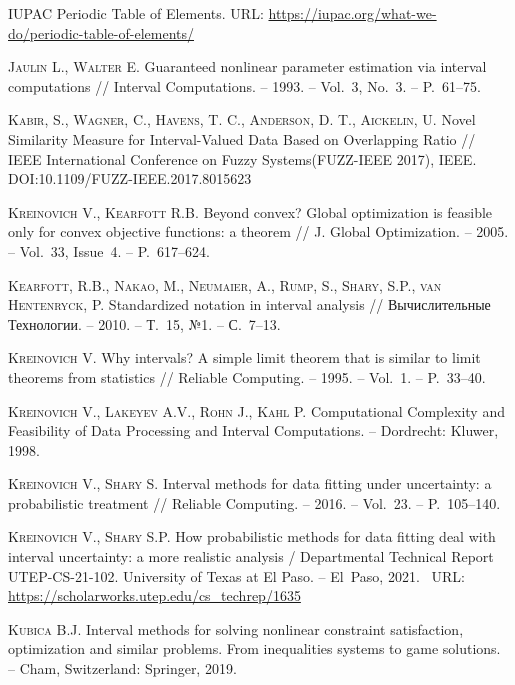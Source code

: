 \documentclass[a5paper,openany]{book}
\newcommand{\electronicbook}{}%
\newcommand{\doi}[1]{
    \ifdefined\electronicbook
        DOI:#1
    \fi}%
\begin{document}
\begin{thebibliography}{999}
IUPAC Periodic Table of Elements. URL: 
\url{https://iupac.org/what-we-do/periodic-table-of-elements/} 
  
\textsc{Jaulin L., Walter E.} Guaranteed nonlinear parameter estimation via interval 
computations // Interval Computations. -- 1993. -- Vol.~3, No.~3. -- P.~61--75. 

\textsc{Kabir, S., Wagner, C., Havens, T. C., Anderson, D. T., Aickelin, U.}
Novel Similarity Measure for Interval-Valued Data Based on Overlapping Ratio // IEEE International Conference on Fuzzy Systems(FUZZ-IEEE 2017), IEEE. \doi{10.1109/FUZZ-IEEE.2017.8015623}
   
\textsc{Kreinovich V., Kearfott R.B.} Beyond convex? Global optimization is feasible 
only for convex objective functions: a theorem // J. Global Optimization. -- 2005. 
-- Vol.~33, Issue~4. -- P.~617--624. 
  
\textsc{Kearfott, R.B., Nakao, M., Neumaier, A., Rump, S., Shary, S.P., van Hentenryck, 
P.} Standardized notation in interval analysis // Вычислительные Технологии. -- 
2010. -- Т.~15, №1. -- С.~7--13. 
  
\textsc{Kreinovich V.} Why intervals? A simple limit theorem that is similar 
to limit theorems from statistics // Reliable Computing. -- 1995. -- Vol.~1. 
-- P.~33--40.  
  
\textsc{Kreinovich V., Lakeyev A.V., Rohn J., Kahl P.} Computational Complexity 
and Feasibility of Data Processing and Interval Computations. -- Dordrecht: Kluwer, 
1998.  
  
\textsc{Kreinovich V., Shary S.} Interval methods for data fitting under uncertainty: 
a probabilistic treatment // Reliable Computing. -- 2016. -- Vol.~23. -- P.~105--140. 
  
\textsc{Kreinovich V., Shary S.P.} How probabilistic methods for data fitting deal 
with interval uncertainty: a more realistic analysis / Departmental Technical Report 
UTEP-CS-21-102. University of Texas at El Paso. -- El~Paso, 2021. \   
URL: \url{https://scholarworks.utep.edu/cs_techrep/1635} 
  
\textsc{Kubica B.J.} Interval methods for solving nonlinear constraint satisfaction, 
optimization and similar problems. From inequalities systems to game solutions. 
-- Cham, Switzerland: Springer, 2019. 
  

\end{thebibliography}
\end{document}
